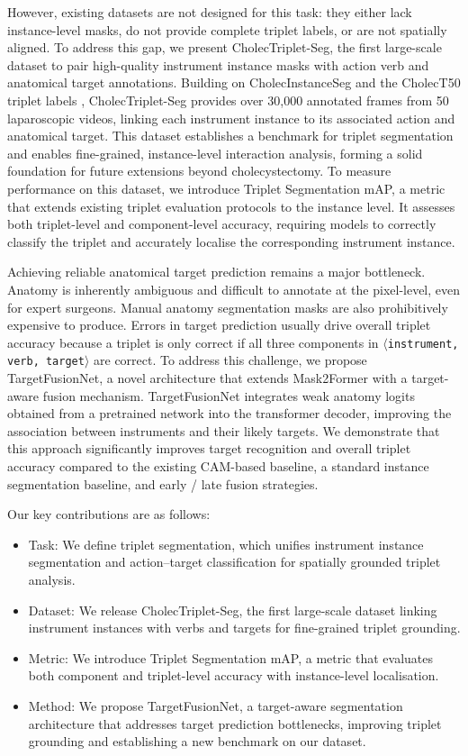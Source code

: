 \documentclass[pdflatex,sn-mathphys-num]{sn-jnl}%
\newcommand{\ivttriplet}{\texttt{$\langle$instrument, verb, target$\rangle$}\xspace}
\newcommand{\anatprior}{weak anatomy\xspace}
\theoremstyle{thmstyleone}%
\theoremstyle{thmstyletwo}%
\theoremstyle{thmstylethree}%
\begin{document}
However, existing datasets are not designed for this task: they either lack instance-level masks, do not provide complete triplet labels, or are not spatially aligned. 
To address this gap, we present CholecTriplet-Seg, the first large-scale dataset to pair high-quality instrument instance masks with action verb and anatomical target annotations. 
Building on CholecInstanceSeg \cite{alabi2025cholecinstanceseg} and the CholecT50 triplet labels \cite{nwoye2022rendezvous}, CholecTriplet-Seg provides over 30,000 annotated frames from 50 laparoscopic videos, linking each instrument instance to its associated action and anatomical target. 
This dataset establishes a benchmark for triplet segmentation and enables fine-grained, instance-level interaction analysis, forming a solid foundation for future extensions beyond cholecystectomy. 
To measure performance on this dataset, we introduce Triplet Segmentation mAP, a metric that extends existing triplet evaluation protocols to the instance level. It assesses both triplet-level and component-level accuracy, requiring models to correctly classify the triplet and accurately localise the corresponding instrument instance.

Achieving reliable anatomical target prediction remains a major bottleneck. Anatomy is inherently ambiguous and difficult to annotate at the pixel-level, even for expert surgeons. 
Manual anatomy segmentation masks are also prohibitively expensive to produce. 
Errors in target prediction usually drive overall triplet accuracy because a triplet is only correct if all three components in \ivttriplet are correct. To address this challenge, we propose TargetFusionNet, a novel architecture that extends Mask2Former \cite{cheng2022masked} with a target-aware fusion mechanism. TargetFusionNet integrates \anatprior logits obtained from a pretrained network into the transformer decoder, improving the association between instruments and their likely targets. We demonstrate that this approach significantly improves target recognition and overall triplet accuracy compared to the existing CAM-based baseline, a standard instance segmentation baseline, and early / late fusion strategies.


Our key contributions are as follows:
\begin{itemize}
\item Task: We define triplet segmentation, which unifies instrument instance segmentation and action–target classification for spatially grounded triplet analysis.
\item Dataset: We release CholecTriplet-Seg, the first large-scale dataset linking instrument instances with verbs and targets for fine-grained triplet grounding.
\item Metric: We introduce Triplet Segmentation mAP, a metric that evaluates both component and triplet-level accuracy with instance-level localisation.
\item Method: We propose TargetFusionNet, a target-aware segmentation architecture that  addresses target prediction bottlenecks, improving triplet grounding and establishing a new benchmark on our dataset.
\end{itemize}
\end{document}
